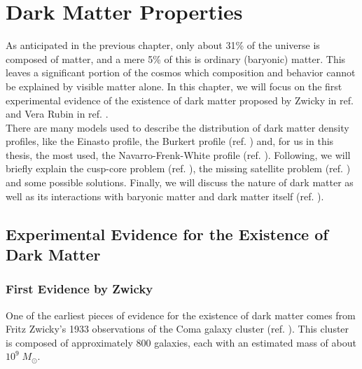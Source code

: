 \chapter{Dark Matter Properties} \label{Dark matter properties}

As anticipated in the previous chapter, only about 31\% of the universe is composed of matter, and a mere 5\% of this is ordinary (baryonic) matter. This leaves a significant portion of the cosmos which composition and behavior cannot be explained by visible matter alone.
In this chapter, we will focus on the first experimental evidence of the existence of dark matter proposed by Zwicky in ref. \cite{Zwicky-1937} and Vera Rubin in ref. \cite{Vera-Rubin}.\\ There are many models used to describe the distribution of dark matter density profiles, like the Einasto profile, the Burkert profile (ref. \cite{Burkert_1995}) and, for us in this thesis, the most used, the Navarro-Frenk-White profile (ref. \cite{Navarro_1997}). Following, we will briefly explain the cusp-core problem (ref. \cite{Cusp-Core-Problem-Del-Popolo}), the missing satellite problem (ref. \cite{too-many-dwarf-galaxy-satellites-problem}) and some possible solutions. Finally, we will discuss the nature of dark matter as well as its interactions with baryonic matter and dark matter itself (ref. \cite{Galaxy-cluster-self-interacting-dark-matter-simulations}).

\section{Experimental Evidence for the Existence of Dark Matter}

\subsection{First Evidence by Zwicky}
One of the earliest pieces of evidence for the existence of dark matter comes from Fritz Zwicky’s 1933 observations of the Coma galaxy cluster (ref. \cite{Zwicky-1937}). This cluster is composed of approximately 800 galaxies, each with an estimated mass of about $10^9 \; M_\odot$. 

